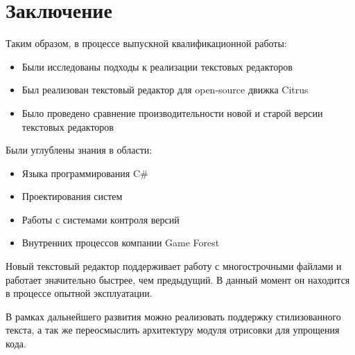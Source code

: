 \documentclass{fefu}
\begin{document}
	\section*{Заключение}
		\par Таким образом, в процессе выпускной квалификационной работы:
		\begin{itemize}
			\item Были исследованы подходы к реализации текстовых редакторов
			\item Был реализован текстовый редактор для open-source движка Citrus
			\item Было проведено сравнение производительности новой и старой версии текстовых
			редакторов
		\end{itemize}
		\par Были углублены знания в области:
		\begin{itemize}
			\item Языка программирования C\#
			\item Проектирования систем
			\item Работы с системами контроля версий
			\item Внутренних процессов компании Game Forest
		\end{itemize}
		\par Новый текстовый редактор поддерживает работу с многострочными файлами и работает
		значительно быстрее, чем предыдущий. В данный момент он находится в процессе опытной
		эксплуатации.
		\par В рамках дальнейшего развития можно реализовать поддержку стилизованного текста,
		а так же переосмыслить архитектуру модуля отрисовки для упрощения кода.
	\newpage
	
		
\end{document}
